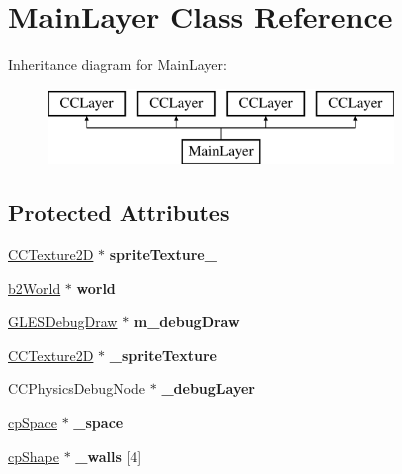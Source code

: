 \hypertarget{interface_main_layer}{\section{Main\-Layer Class Reference}
\label{interface_main_layer}
}
Inheritance diagram for Main\-Layer\-:\begin{figure}[H]
\begin{center}
\leavevmode
\includegraphics[height=2.000000cm]{interface_main_layer}
\end{center}
\end{figure}
\subsection*{Protected Attributes}
\begin{DoxyCompactItemize}
\item 
\hypertarget{interface_main_layer_a1ad86a442fecaf4acc6ee2cca77f67b7}{\hyperlink{class_c_c_texture2_d}{C\-C\-Texture2\-D} $\ast$ {\bfseries sprite\-Texture\-\_\-}}\label{interface_main_layer_a1ad86a442fecaf4acc6ee2cca77f67b7}

\item 
\hypertarget{interface_main_layer_a7375f2e997376ac7571423005ccd0ea7}{\hyperlink{classb2_world}{b2\-World} $\ast$ {\bfseries world}}\label{interface_main_layer_a7375f2e997376ac7571423005ccd0ea7}

\item 
\hypertarget{interface_main_layer_a04df3026b9b94f89c70f64c426b295fe}{\hyperlink{class_g_l_e_s_debug_draw}{G\-L\-E\-S\-Debug\-Draw} $\ast$ {\bfseries m\-\_\-debug\-Draw}}\label{interface_main_layer_a04df3026b9b94f89c70f64c426b295fe}

\item 
\hypertarget{interface_main_layer_a889f45e8aab26fd65efd98c29f28cdd1}{\hyperlink{class_c_c_texture2_d}{C\-C\-Texture2\-D} $\ast$ {\bfseries \-\_\-sprite\-Texture}}\label{interface_main_layer_a889f45e8aab26fd65efd98c29f28cdd1}

\item 
\hypertarget{interface_main_layer_a06d11d5f62d26795c052474dc3ade8bc}{C\-C\-Physics\-Debug\-Node $\ast$ {\bfseries \-\_\-debug\-Layer}}\label{interface_main_layer_a06d11d5f62d26795c052474dc3ade8bc}

\item 
\hypertarget{interface_main_layer_a0fe751f0636ce89118c31660c0b5fd27}{\hyperlink{structcp_space}{cp\-Space} $\ast$ {\bfseries \-\_\-space}}\label{interface_main_layer_a0fe751f0636ce89118c31660c0b5fd27}

\item 
\hypertarget{interface_main_layer_ac99eba42b858da3a6a673824e05ab52a}{\hyperlink{structcp_shape}{cp\-Shape} $\ast$ {\bfseries \-\_\-walls} \mbox{[}4\mbox{]}}\label{interface_main_layer_ac99eba42b858da3a6a673824e05ab52a}

\end{DoxyCompactItemize}


